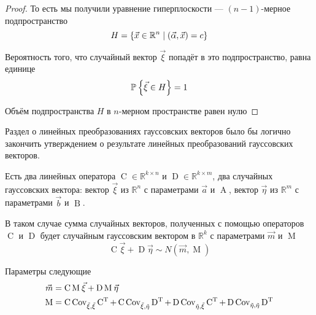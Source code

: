 \begin{proof}
  То есть мы получили уравнение гиперплоскости ---
  $\left( n-1 \right)$-мерное подпространство
  $$H = \left\{ \vec{x} \in \mathbb{R}^n
      \;\middle|\; \left( \vec{\alpha}, \vec{x} \right) = c \right\}$$

  Вероятность того, что случайный вектор $\vec{\xi}$ попадёт в это
  подпространство, равна единице
  $$\mathbb{P}_{{}}\left\{ \vec{\xi} \in H \right\} = 1$$

  Объём подпространства $H$ в $n$-мерном пространстве равен нулю
\end{proof}

Раздел о линейных преобразованиях гауссовских векторов было бы логично закончить
утверждением о результате линейных преобразований гауссовских векторов.

\begin{affirmation}\label{affirmation:gaussianVector:linearTransformations}
  Есть два линейных оператора $\operatorname{C} \in \mathbb{R}^{k \times n}$
  и $\operatorname{D} \in \mathbb{R}^{k \times m}$,
  два случайных гауссовских вектора: вектор $\vec{\xi}$ из $\mathbb{R}^n$ с
  параметрами $\vec{a}$ и $\operatorname{A}$, вектор $\vec{\eta}$ из
  $\mathbb{R}^m$ с параметрами $\vec{b}$ и $\operatorname{B}$.

  В таком случае сумма случайных векторов, полученных с помощью операторов
  $\operatorname{C}$ и $\operatorname{D}$ будет случайным гауссовским вектором
  в $\mathbb{R}^k$ с параметрами $\vec{m}$ и $\operatorname{M}$
  $$\operatorname{C} \vec{\xi} + \operatorname{D} \vec{\eta}
      \sim N\left( \vec{m}, \operatorname{M} \right)$$

  Параметры следующие
  \begin{align*}
      \vec{m} &= \operatorname{C} \operatorname{M}_{} \vec{\xi}
      + \operatorname{D} \operatorname{M}_{} \vec{\eta} \\
      \operatorname{M} &= \operatorname{C} \operatorname{Cov^{}_{\vec{\xi}, \vec{\xi}}} \operatorname{C^T}
      + \operatorname{C} \operatorname{Cov^{}_{\vec{\xi}, \vec{\eta}}} \operatorname{D^T}
      + \operatorname{D} \operatorname{Cov^{}_{\vec{\eta}, \vec{\xi}}} \operatorname{C^T}
      + \operatorname{D} \operatorname{Cov^{}_{\vec{\eta}, \vec{\eta}}} \operatorname{D^T}
  \end{align*}
\end{affirmation}
